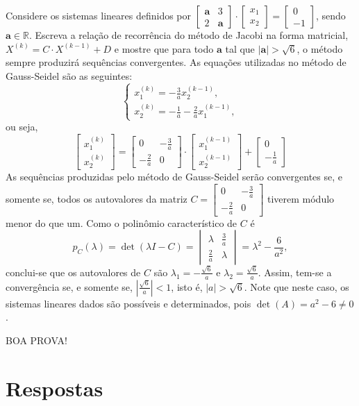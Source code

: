\documentclass[12pt,a4paper]{article}
\newcommand*\R{\mathbb{R}}
\begin{document}
\begin{ExerciseList}
\Exercise[title={2,5}]
Considere os sistemas lineares definidos por
$
\begin{bmatrix}
\mathbf{a} & 3 \\2 & \mathbf{a}
\end{bmatrix}
\cdot
\begin{bmatrix}
x_1 \\ x_2
\end{bmatrix}
=
\begin{bmatrix}
0 \\-1
\end{bmatrix}$,
sendo $\mathbf{a} \in \R$. Escreva a relação de recorrência do método de Jacobi na forma matricial,
$X^{(k)} = C \cdot X^{(k-1)} +D$
e mostre que para todo $\mathbf{a}$ tal que $|\mathbf{a}| > \sqrt{6}$, o método sempre produzirá sequências convergentes.
\Answer
As equações utilizadas no método de Gauss-Seidel são as seguintes:
\[
\begin{cases}
x_1^{(k)} = - \frac{3}{a} x_2^{(k-1)},\\
x_2^{(k)} = -\frac{1}{a} - \frac{2}{a}x_1^{(k-1)},
\end{cases}
\]
ou seja,
\[
\begin{bmatrix}
x_1^{(k)}\\
x_2^{(k)}
\end{bmatrix}
=
\begin{bmatrix}
0 & -\frac{3}{a}\\
-\frac{2}{a} & 0
\end{bmatrix}
\cdot
\begin{bmatrix}
x_1^{(k-1)}\\
x_2^{(k-1)}
\end{bmatrix}
+
\begin{bmatrix}
0\\
-\frac{1}{a}
\end{bmatrix}
\]
As sequências produzidas pelo método de Gauss-Seidel serão convergentes se, e somente se, todos os autovalores da matriz $C = 
\begin{bmatrix}
0 & -\frac{3}{a}\\
-\frac{2}{a} & 0
\end{bmatrix}$ tiverem módulo menor do que um. Como o polinômio característico de $C$ é
\[
p_C(\lambda) = \det(\lambda I - C)
=
\begin{vmatrix}
\lambda & \frac{3}{a}\\
\frac{2}{a} & \lambda
\end{vmatrix}
= \lambda^2-\frac{6}{a^2},
\]
conclui-se que os autovalores de $C$ são $\lambda_1 = - \frac{\sqrt{6}}{a}$ e $\lambda_2 = \frac{\sqrt{6}}{a}$. Assim, tem-se a convergência se, e somente se, $\left|\frac{\sqrt{6}}{a}\right| < 1$, isto é, $|a| > \sqrt{6}$. Note que neste caso, os sistemas lineares dados são possíveis e determinados, pois $\det(A) = a^2-6 \neq 0$.
\end{ExerciseList}

\vfill
\begin{center}
BOA PROVA!
\end{center}

\newpage
\restoregeometry
\section*{Respostas}
\shipoutAnswer
\end{document}
